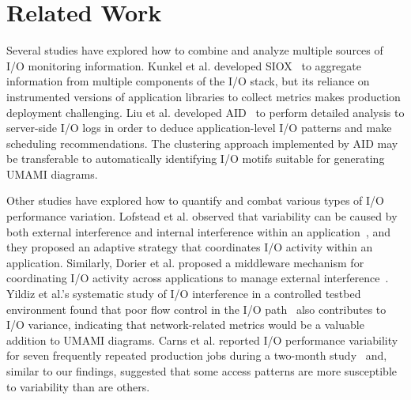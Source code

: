 \section{Related Work} \label{sec:related}

Several studies have explored how to combine and analyze multiple sources of I/O monitoring information.
Kunkel et al. developed SIOX~\cite{Kunkel:2014:SAC:2769884.2769901} to aggregate information from multiple components of the I/O stack, 
but its reliance on instrumented versions of application libraries to collect metrics makes production deployment challenging.
Liu et al. developed AID~\cite{Liu2016} to perform detailed analysis to server-side I/O logs in order to deduce application-level I/O patterns and make scheduling recommendations.  The clustering approach implemented by AID may be transferable to automatically identifying I/O motifs suitable for generating UMAMI diagrams.

Other studies have explored how to quantify and combat various types of I/O performance variation.
Lofstead et al. observed that variability can be caused by both external interference and internal interference within an application~\cite{Lofstead2010}, and they proposed an adaptive strategy that coordinates I/O activity within an application.
Similarly, Dorier et al. proposed a middleware mechanism for coordinating I/O activity across applications to manage external interference~\cite{dorier2014calciom}.
Yildiz et al.'s systematic study of I/O interference in a controlled testbed environment found that poor flow control in the I/O path~\cite{Yildiz2016} also contributes to I/O variance, indicating that network-related metrics would be a valuable addition to UMAMI diagrams.
Carns et al. reported I/O performance variability for seven frequently repeated production jobs during a two-month study~\cite{carns2011understanding} and, similar to our findings, suggested that some access patterns are more susceptible to variability than are others.
